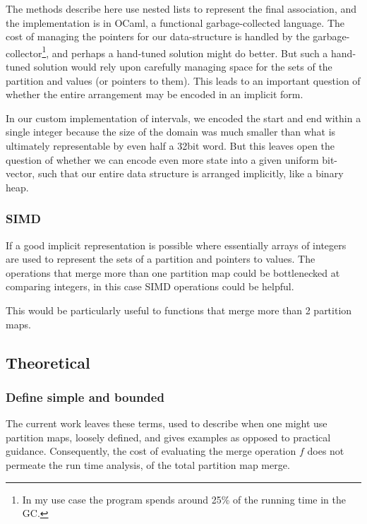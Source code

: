 \documentclass{article}
\begin{document}
The methods describe here use nested lists to represent the final association,
and the implementation is in OCaml,
a functional garbage-collected language.
The cost of managing the pointers for our data-structure is handled by the
garbage-collector\footnote{
  In my use case the program spends around 25\% of the running time in the GC.},
and perhaps a hand-tuned solution might do better.
But such a hand-tuned solution would rely upon carefully managing space for
the sets of the partition and values (or pointers to them).
This leads to an important question of whether the entire arrangement may be
encoded in an implicit form.

In our custom implementation of intervals, we encoded the start and end
within a single integer because the size of the domain was much smaller
than what is ultimately representable by even half a 32bit word.
But this leaves open the question of whether we can encode even more state
into a given uniform bit-vector,
such that our entire data structure is arranged implicitly,
like a binary heap.

\subsubsection{SIMD}

If a good implicit representation is possible where essentially arrays of
integers are used to represent the sets of a partition and pointers to values.
The operations that merge more than one partition map could be bottlenecked
at comparing integers,
in this case SIMD operations could be helpful.

This would be particularly useful to functions that merge more than 2
partition maps.

\subsection{Theoretical}

\subsubsection{Define simple and bounded}

The current work leaves these terms,
used to describe when one might use partition maps,
loosely defined,
and gives examples as opposed to practical guidance.
Consequently,
the cost of evaluating the merge operation $f$ does not permeate
the run time analysis,
of the total partition map merge.
\end{document}
